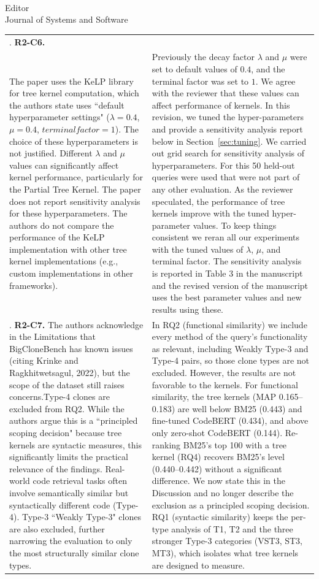 \documentclass[
pagenumber=false, %
parskip=half, %
fromalign=right, %
foldmarks=false, %
addrfield=false %
]{scrlttr2}
\newcounter{commentcounter} %
\newcommand{\comment}[1]{\refstepcounter{commentcounter}\thecommentcounter.} %
\begin{document}
\begin{letter}{\\Editor\\Journal of Systems and Software}
\begin{longtable}{p{}p{}}
		\comment{2} \textbf{R2-C6.}\\ The paper uses the KeLP library for tree kernel computation, which the authors state uses ``default hyperparameter settings" ($\lambda=0.4$, $\mu=0.4$, $terminal factor=1$).
		The choice of these hyperparameters is not justified. Different $\lambda$ and $\mu$ values can significantly affect kernel performance, particularly for the Partial Tree Kernel.
		The paper does not report sensitivity analysis for these hyperparameters. The authors do not compare the performance of the KeLP implementation with other tree kernel implementations (e.g., custom implementations in other frameworks). &  Previously the decay factor $\lambda$ and $\mu$ were set to default values of $0.4$, and the terminal factor was set to $1$. We agree with the reviewer that these values can affect performance of kernels. In this revision, we tuned the hyper-parameters and provide a sensitivity analysis report below in Section~\ref{sec:tuning}. We carried out grid search for sensitivity analysis of hyperparameters. For this 50 held-out queries were used that were not part of any other evaluation. As the reviewer speculated, the performance of tree kernels improve with the tuned hyper-parameter values. To keep things consistent we reran all our experiments with the tuned values of $\lambda$, $\mu$, and terminal factor. The sensitivity analysis is reported in Table 3 in the manuscript and the revised version of the manuscript uses the best parameter values and new results using these.  \\\midrule
		
		\comment{2} \textbf{R2-C7.} The authors acknowledge in the Limitations that BigCloneBench has known issues (citing Krinke and Ragkhitwetsagul, 2022), but the scope of the dataset still raises concerns.Type-4 clones are excluded from RQ2. While the authors argue this is a ``principled scoping decision" because tree kernels are syntactic measures, this significantly limits the practical relevance of the findings. Real-world code retrieval tasks often involve semantically similar but syntactically different code (Type-4). Type-3 ``Weakly Type-3" clones are also excluded, further narrowing the evaluation to only the most structurally similar clone types. &  In RQ2 (functional similarity) we include every method of the query's functionality as relevant, including Weakly Type-3 and Type-4 pairs, so those clone types are not excluded. However, the results are not favorable to the kernels. For functional similarity, the tree kernels (MAP 0.165--0.183) are well below BM25 (0.443) and fine-tuned CodeBERT (0.434), and above only zero-shot CodeBERT (0.144). Re-ranking BM25's top 100 with a tree kernel (RQ4) recovers BM25's level (0.440--0.442) without a significant difference. We now state this in the Discussion and no longer describe the exclusion as a principled scoping decision.
		RQ1 (syntactic similarity) keeps the
		per-type analysis of T1, T2 and the three stronger Type-3 categories (VST3, ST3, MT3), which isolates
		what tree kernels are designed to measure.
		

\end{longtable}
\end{letter}
\end{document}
